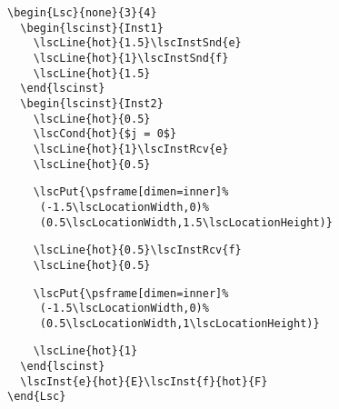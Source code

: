 \documentclass{article}
\begin{document}
\begin{center}%
%
\begin{minipage}{0.30\textwidth}
\end{minipage}
\hfill
\begin{minipage}{0.685\textwidth}%
\small%
{\gray\begin{verbatim}
\begin{Lsc}{none}{3}{4}
  \begin{lscinst}{Inst1}
    \lscLine{hot}{1.5}\lscInstSnd{e}
    \lscLine{hot}{1}\lscInstSnd{f}
    \lscLine{hot}{1.5}
  \end{lscinst}
  \begin{lscinst}{Inst2}
    \lscLine{hot}{0.5}
    \lscCond{hot}{$j = 0$}
    \lscLine{hot}{1}\lscInstRcv{e}
    \lscLine{hot}{0.5}
\end{verbatim}}%
\verbunskip%
{\begin{verbatim}
    \lscPut{\psframe[dimen=inner]%
     (-1.5\lscLocationWidth,0)%
     (0.5\lscLocationWidth,1.5\lscLocationHeight)}
\end{verbatim}}%
\verbunskip%
{\gray\begin{verbatim}
    \lscLine{hot}{0.5}\lscInstRcv{f}
    \lscLine{hot}{0.5}
\end{verbatim}}%
\verbunskip%
{\begin{verbatim}
    \lscPut{\psframe[dimen=inner]%
     (-1.5\lscLocationWidth,0)%
     (0.5\lscLocationWidth,1\lscLocationHeight)}
\end{verbatim}}%
\verbunskip%
{\gray\begin{verbatim}
    \lscLine{hot}{1}
  \end{lscinst}
  \lscInst{e}{hot}{E}\lscInst{f}{hot}{F}
\end{Lsc}
\end{verbatim}}%
\end{minipage}
\end{center}%>@>
\end{document}
